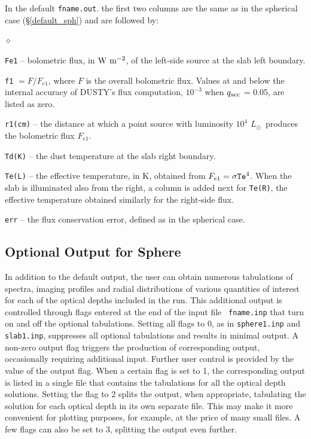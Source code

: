 \documentclass[11pt]{article}
\def\D  {{\sf DUSTY}}
\def\E#1{\hbox{$10^{#1}$}}
\def\Lo     {\hbox{$L_{\odot}$}}
\begin{document}
In the default {\tt fname.out}. the first two columns are the same as in the
spherical case (\S\ref{default_sph}) and are followed by:
\begin{list}{$\diamond$}{}
\item{\tt Fe1} --
bolometric flux, in $\rm W\ m^{-2}$, of the left-side source at the slab left
boundary.
\item{\tt f1} $= F/F_{e1}$, where $F$ is the overall bolometric flux.
Values at and below the internal accuracy of \D's flux computation, \E{-3} when
$q_{\rm acc}$ = 0.05, are listed as zero.
\item{\tt r1(cm)} -- the distance at which a point source with luminosity
\E4 \Lo\ produces the bolometric flux $F_{e1}$.
\item  {\tt Td(K)} -- the dust temperature at the slab right boundary.
\item
{\tt Te(L)} -- the effective temperature, in K, obtained from $F_{e1} =
\sigma{\tt Te}^4$.  When the slab is illuminated also from the right, a column
is added next for {\tt Te(R)}, the effective temperature obtained similarly for
the right-side flux.
\item{\tt err} -- the flux conservation error, defined as in the spherical case.

\end{list}


\subsection{Optional Output for Sphere}
\label{OptionalOutput_sph}

In addition to the default output, the user can obtain numerous tabulations of
spectra, imaging profiles and radial distributions of various quantities of
interest for each of the optical depths included in the run. This additional
output is controlled through flags entered at the end of the input file {\tt
fname.inp} that turn on and off the optional tabulations.  Setting all flags to
0, as in {\tt sphere1.inp} and {\tt slab1.inp}, suppresses all optional
tabulations and results in minimal output. A non-zero output flag triggers the
production of corresponding output, occasionally requiring additional input.
Further user control is provided by the value of the output flag. When a
certain flag is set to 1, the corresponding output is listed in a single file
that contains the tabulations for all the optical depth solutions. Setting the
flag to 2 splits the output, when appropriate, tabulating the solution for each
optical depth in its own separate file. This may make it more convenient for
plotting purposes, for example, at the price of many small files.  A few flags
can also be set to 3, splitting the output even further.
\end{document}
